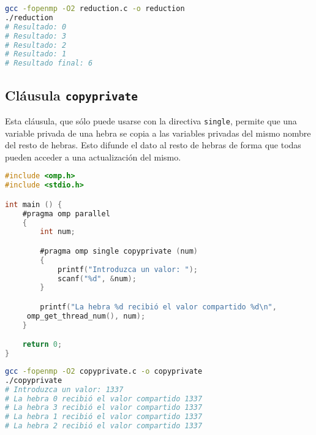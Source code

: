 \begin{lstlisting}[language=sh]
gcc -fopenmp -O2 reduction.c -o reduction
./reduction
# Resultado: 0
# Resultado: 3
# Resultado: 2
# Resultado: 1
# Resultado final: 6
\end{lstlisting}

\subsection{Cláusula \texttt{copyprivate}}

Esta cláusula, que sólo puede usarse con la directiva \texttt{single}, permite que una variable privada de una hebra se copia a las variables privadas del mismo nombre del resto de hebras.
Esto difunde el dato al resto de hebras de forma que todas pueden acceder a una actualización del mismo.

\begin{lstlisting}[language=C]
#include <omp.h>
#include <stdio.h>

int main () {
	#pragma omp parallel
	{
		int num;

		#pragma omp single copyprivate (num)
		{
			printf("Introduzca un valor: ");
			scanf("%d", &num);
		}

		printf("La hebra %d recibió el valor compartido %d\n",
	 omp_get_thread_num(), num);
	}

	return 0;
}
\end{lstlisting}

\begin{lstlisting}[language=sh]
gcc -fopenmp -O2 copyprivate.c -o copyprivate
./copyprivate
# Introduzca un valor: 1337
# La hebra 0 recibió el valor compartido 1337
# La hebra 3 recibió el valor compartido 1337
# La hebra 1 recibió el valor compartido 1337
# La hebra 2 recibió el valor compartido 1337
\end{lstlisting}
